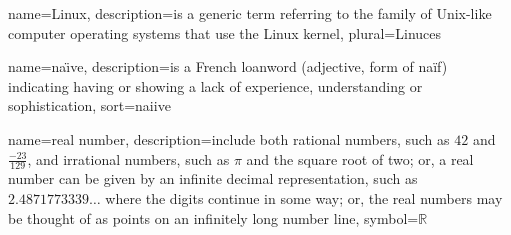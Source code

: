 {
  name=Linux,
  description={is a generic term referring to the family of Unix-like
               computer operating systems that use the Linux kernel},
  plural=Linuces
}

{
  name=na\"{\i}ve,
  description={is a French loanword (adjective, form of naïf)
               indicating having or showing a lack of experience,
               understanding or sophistication},
  sort=naiive
}

{
  name={real number},
  description={include both rational numbers, such as $42$ and 
               $\frac{-23}{129}$, and irrational numbers, 
               such as $\pi$ and the square root of two; or,
               a real number can be given by an infinite decimal
               representation, such as $2.4871773339\ldots$ where
               the digits continue in some way; or, the real
               numbers may be thought of as points on an infinitely
               long number line},
  symbol={\ensuremath{\mathbb{R}}}
}


